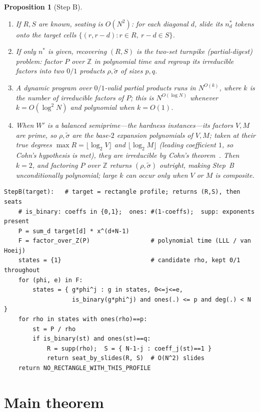 \documentclass[11pt]{article}
\theoremstyle{definition}
\theoremstyle{plain}
\newtheorem{proposition}{Proposition}
\theoremstyle{remark}
\newcommand{\Z}{\mathbb{Z}}
\begin{document}
\begin{proposition}[Step B]\label{prop:B}
\begin{enumerate}[label=\textup{(\roman*)},leftmargin=2.4em]
\item If $R,S$ are known, seating is $O(N^2)$: for each diagonal $d$, slide its $n^{*}_d$
tokens onto the target cells $\{(r,r-d):r\in R,\ r-d\in S\}$.
\item If only $n^{*}$ is given, recovering $(R,S)$ is the two-set turnpike (partial-digest)
problem: factor $P$ over $\Z$ in polynomial time and regroup its irreducible factors into two
$0/1$ products $\rho,\tilde\sigma$ of sizes $p,q$.
\item A dynamic program over $0/1$-valid partial products runs in $N^{O(k)}$, where $k$ is
the number of irreducible factors of $P$; this is $N^{O(\log N)}$ whenever $k=O(\log^2 N)$ and
polynomial when $k=O(1)$.
\item When $W'$ is a balanced semiprime---the hardness instances---its factors $V,M$ are
prime, so $\rho,\tilde\sigma$ are the base-$2$ expansion polynomials of $V,M$; taken at their
true degrees $\max R=\lfloor\log_2 V\rfloor$ and $\lfloor\log_2 M\rfloor$ (leading coefficient
$1$, so Cohn's hypothesis is met), they are irreducible by Cohn's theorem~\cite{bfo}. Then
$k=2$, and factoring $P$ over $\Z$ returns $(\rho,\tilde\sigma)$ outright, making Step~B
\emph{unconditionally polynomial}; large $k$ can occur only when $V$ or $M$ is composite.
\end{enumerate}
\end{proposition}

\begin{verbatim}
StepB(target):   # target = rectangle profile; returns (R,S), then seats
    # is_binary: coeffs in {0,1};  ones: #(1-coeffs);  supp: exponents present
    P = sum_d target[d] * x^(d+N-1)
    F = factor_over_Z(P)                 # polynomial time (LLL / van Hoeij)
    states = {1}                         # candidate rho, kept 0/1 throughout
    for (phi, e) in F:
        states = { g*phi^j : g in states, 0<=j<=e,
                   is_binary(g*phi^j) and ones(.) <= p and deg(.) < N }
    for rho in states with ones(rho)==p:
        st = P / rho
        if is_binary(st) and ones(st)==q:
            R = supp(rho);  S = { N-1-j : coeff_j(st)==1 }
            return seat_by_slides(R, S)  # O(N^2) slides
    return NO_RECTANGLE_WITH_THIS_PROFILE
\end{verbatim}

\section{Main theorem}\label{sec:main}
\end{document}
